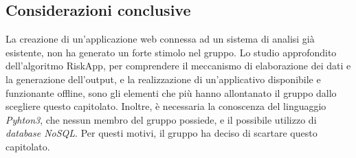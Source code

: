 \subsection{Considerazioni conclusive}

La creazione di un'applicazione web connessa ad un sistema di analisi già esistente, non ha generato un forte stimolo nel gruppo. Lo studio approfondito dell’algoritmo RiskApp, per comprendere il meccanismo di elaborazione dei dati e la generazione dell'output, e la realizzazione di un'applicativo disponibile e funzionante offline, sono gli elementi che più hanno allontanato il gruppo dallo scegliere questo capitolato. 
Inoltre, è necessaria la conoscenza del linguaggio \textit{Pyhton3}, che nessun membro del gruppo possiede, e il possibile utilizzo di \textit{database NoSQL}.
Per questi motivi, il gruppo ha deciso di scartare questo capitolato. 
